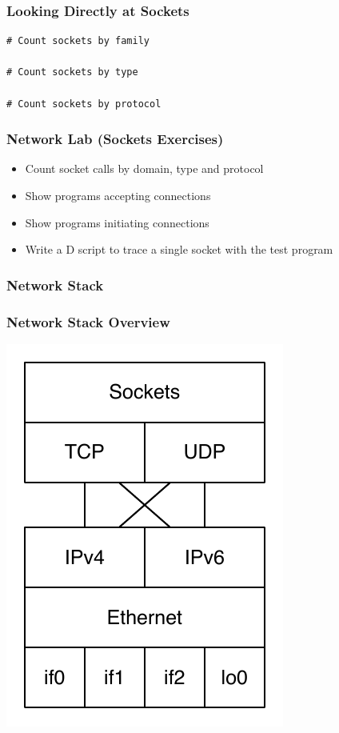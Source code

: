 \documentclass[pdftex]{beamer} %
\begin{document}
\begin{frame}[fragile]
  \frametitle{Looking Directly at Sockets}
\begin{verbatim}
# Count sockets by family

# Count sockets by type

# Count sockets by protocol
\end{verbatim}  
\end{frame}

\begin{frame}
  \frametitle{Network Lab (Sockets Exercises)}
  \begin{itemize}
  \item Count socket calls by domain, type and protocol
  \item Show programs accepting connections
  \item Show programs initiating connections
  \item Write a D script to trace a single socket with the test program
  \end{itemize}
\end{frame}

\begin{frame}
  \frametitle{Network Stack}
\end{frame}

\begin{frame}
  \frametitle{Network Stack Overview}
\centering
\includegraphics{../figures/tcpipstack}
\end{frame}
\end{document}
